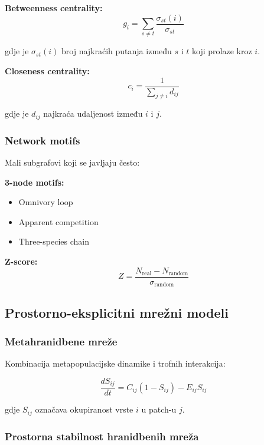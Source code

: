 \documentclass[11pt,oneside]{book}
\begin{document}
\textbf{Betweenness centrality:}
\begin{equation}
	g_i = \sum_{s \neq t} \frac{\sigma_{st}(i)}{\sigma_{st}}
\end{equation}

gdje je $\sigma_{st}(i)$ broj najkraćih putanja između $s$ i $t$ koji prolaze kroz $i$.

\textbf{Closeness centrality:}
\begin{equation}
	c_i = \frac{1}{\sum_{j \neq i} d_{ij}}
\end{equation}

gdje je $d_{ij}$ najkraća udaljenost između $i$ i $j$.

\subsubsection{Network motifs}

Mali subgrafovi koji se javljaju često:

\textbf{3-node motifs:}
\begin{itemize}
	\item Omnivory loop
	\item Apparent competition  
	\item Three-species chain
\end{itemize}

\textbf{Z-score:}
\begin{equation}
	Z = \frac{N_{\text{real}} - N_{\text{random}}}{\sigma_{\text{random}}}
\end{equation}

\subsection{Prostorno-eksplicitni mrežni modeli}

\subsubsection{Metahranidbene mreže}

Kombinacija metapopulacijske dinamike i trofnih interakcija:

\begin{equation}
	\frac{dS_{ij}}{dt} = C_{ij}(1 - S_{ij}) - E_{ij} S_{ij}
\end{equation}

gdje $S_{ij}$ označava okupiranost vrste $i$ u patch-u $j$.

\subsubsection{Prostorna stabilnost hranidbenih mreža}
\end{document}
